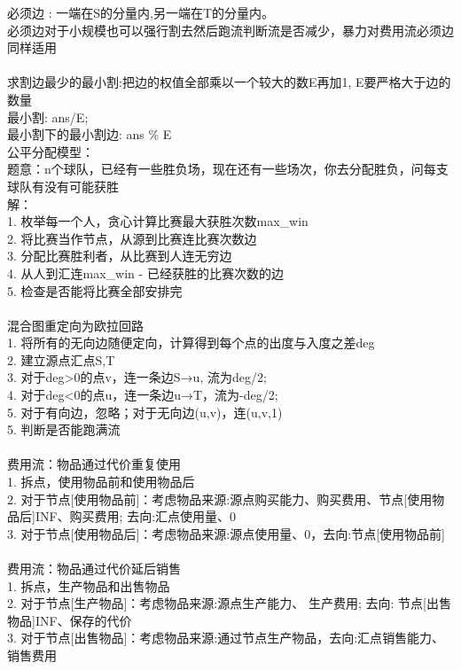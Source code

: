 \documentclass[10pt]{ctexart}
\begin{document}
{必须边 : 一端在S的分量内,另一端在T的分量内。\\
必须边对于小规模也可以强行割去然后跑流判断流是否减少，暴力对费用流必须边同样适用\\
\\
求割边最少的最小割:把边的权值全部乘以一个较大的数E再加1, E要严格大于边的数量\\
最小割: ans/E;\\
最小割下的最小割边: ans \% E\\
公平分配模型：\\
题意：n个球队，已经有一些胜负场，现在还有一些场次，你去分配胜负，问每支球队有没有可能获胜\\
解：\\
1. 枚举每一个人，贪心计算比赛最大获胜次数max\_win\\
2. 将比赛当作节点，从源到比赛连比赛次数边\\
3. 分配比赛胜利者，从比赛到人连无穷边\\
4. 从人到汇连{max\_win - 已经获胜的比赛次数}的边\\
5. 检查是否能将比赛全部安排完\\
\\
混合图重定向为欧拉回路\\
1. 将所有的无向边随便定向，计算得到每个点的出度与入度之差deg\\
2. 建立源点汇点S,T\\
3. 对于deg>0的点v，连一条边S→u, 流为deg/2;\\
4. 对于deg<0的点u，连一条边u→T，流为-deg/2;\\
5. 对于有向边，忽略；对于无向边(u,v)，连(u,v,1)\\
5. 判断是否能跑满流\\
\\
费用流：物品通过代价重复使用\\
1. 拆点，使用物品前和使用物品后\\
2. 对于节点[使用物品前]：考虑物品来源:源点{购买能力、购买费用}、节点[使用物品后]{INF、购买费用}; 去向:汇点{使用量、0}\\
3. 对于节点[使用物品后]：考虑物品来源:源点{使用量、0}，去向:节点[使用物品前]\\
\\
费用流：物品通过代价延后销售\\
1. 拆点，生产物品和出售物品\\
2. 对于节点[生产物品]：考虑物品来源:源点{生产能力、 生产费用}; 去向: 节点[出售物品]{INF、保存的代价}\\
3. 对于节点[出售物品]：考虑物品来源:通过节点生产物品，去向:汇点{销售能力、销售费用}\\
}
\end{document}
